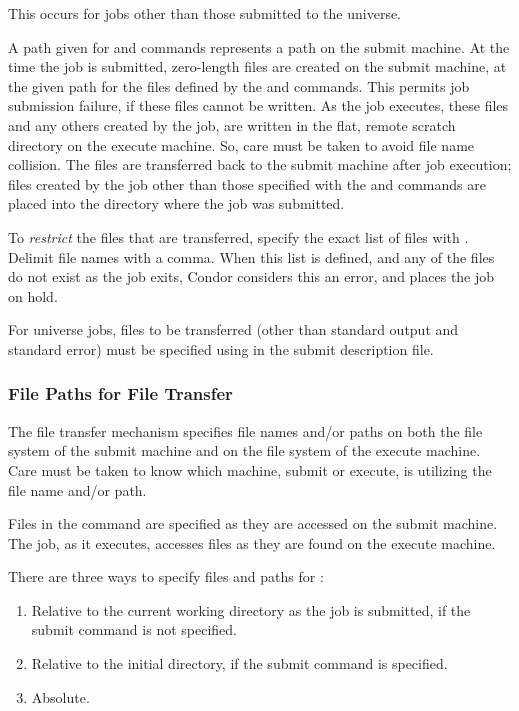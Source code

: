 This occurs for jobs other than those submitted to the 
universe.

A path given for  and  commands represents
a path on the submit machine.
At the time the job is submitted, zero-length files are created
on the submit machine, at the given path for the files defined by the  
 and  commands.
This permits job submission failure, if these files cannot be written.
As the job executes, these files and any others created by the job,
are written in the flat, remote scratch directory on the execute machine.
So, care must be taken to avoid file name collision.
The files are transferred back to the submit machine after job execution;
files created by the job other than those specified with the
 and  commands are placed into the
directory where the job was submitted.

To \emph{restrict} the files that are transferred,
specify the exact list of files with  .
Delimit file names with a comma.
When this list is defined, and any of the files do not exist as the
job exits, Condor considers this an error, and places the job on hold.

For  universe jobs, files to be transferred 
(other than standard output and standard error)
must be specified using 
in the submit description file. 

\subsubsection{File Paths for File Transfer}



The file transfer mechanism specifies file names and/or paths on
both the file system of the submit machine and on the
file system of the execute machine.
Care must be taken to know which machine, submit or execute,
is utilizing the file name and/or path. 

Files in the  command
are specified as they are accessed on the submit machine.
The job, as it executes, accesses files as they are
found on the execute machine.

There are three ways to specify files and paths
for :
\begin{enumerate}
\item Relative to the current working directory as the job is submitted,
if the submit command  is not specified.
\item Relative to the initial directory, if the submit command 
 is specified.
\item Absolute.
\end{enumerate}

